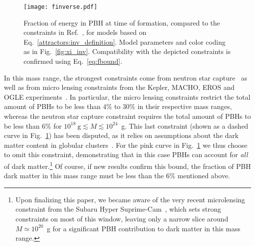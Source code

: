 \begin{figure}
%
\centering
\texttt{[image: finverse.pdf]}
%
\caption{Fraction of energy in PBH at time of formation, compared to the constraints in Ref.~\cite{Carr:2016drx}, for models based on Eq.~\eqref{attractors:inv_definition}. Model parameters and color coding as in Fig.~\ref{fig:xi_inv}. Compatibility with the depicted constraints is confirmed using Eq.~\eqref{eq:fbound}.}
\label{fig:BH2}
%
\end{figure}

In this mass range, the strongest constraints come from neutron star capture~\cite{Capela:2013yf} as well as from micro lensing constraints from the Kepler, MACHO, EROS and OGLE experiments~\cite{Griest:2013aaa,Tisserand:2006zx,Novati:2013fxa}. 
In particular, the micro lensing constraints restrict the total amount of PBHs to be less than $4\%$ to $30\%$ in their respective mass ranges, whereas the neutron star capture constraint requires the total amount of PBHs to be less than $6\%$ for $10^{18}~\text{g} \lesssim M \lesssim 10^{24}$~g. 
This last constraint (shown as a dashed curve in Fig.~\ref{fig:BH2}) has been disputed, as it relies on assumptions about the dark matter content in globular clusters~\cite{Carr:2016drx}. For the pink curve in Fig.~\ref{fig:BH2} we thus choose to omit this constraint, demonstrating that in this case PBHs can account for \textit{all} of dark matter.\footnote{Upon finalizing this paper, we became aware of the very recent microlensing constraint from the Subaru Hyper Suprime-Cam~\cite{Niikura:2017zjd}, which sets strong constraints on most of this window, leaving only a narrow slice around $M \simeq 10^{20}$~g for a significant PBH contribution to dark matter in this mass range.} Of course, if new results confirm this bound, the fraction of PBH dark matter in this mass range must be less than the $6\%$ mentioned above. 



